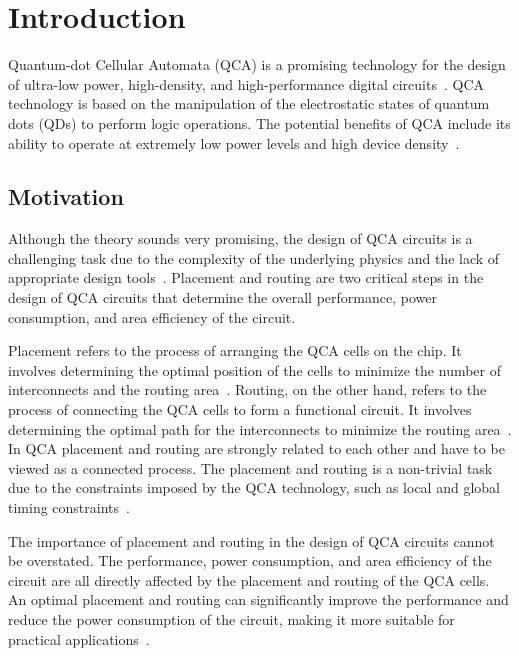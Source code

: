 
\chapter{Introduction}\label{chapter:introduction}
Quantum-dot Cellular Automata (QCA) is a promising technology for the design of ultra-low power, high-density, and high-performance digital circuits~\cite{perri2012new}. QCA technology is based on the manipulation of the electrostatic states of quantum dots (QDs) to perform logic operations. The potential benefits of QCA include its ability to operate at extremely low power levels and high device density~\cite{sen2015towards}.

\section{Motivation}
Although the theory sounds very promising, the design of QCA circuits is a challenging task due to the complexity of the underlying physics and the lack of appropriate design tools~\cite{safoev2020design}. Placement and routing are two critical steps in the design of QCA circuits that determine the overall performance, power consumption, and area efficiency of the circuit.

Placement refers to the process of arranging the QCA cells on the chip. It involves determining the optimal position of the cells to minimize the number of interconnects and the routing area~\cite{kahng2011vlsi}. Routing, on the other hand, refers to the process of connecting the QCA cells to form a functional circuit. It involves determining the optimal path for the interconnects to minimize the routing area~\cite{kahng2011vlsi}. In QCA placement and routing are strongly related to each other and have to be viewed as a connected process. The placement and routing is a non-trivial task due to the constraints imposed by the QCA technology, such as local and global timing constraints~\cite{ortho}.

The importance of placement and routing in the design of QCA circuits cannot be overstated. The performance, power consumption, and area efficiency of the circuit are all directly affected by the placement and routing of the QCA cells. An optimal placement and routing can significantly improve the performance and reduce the power consumption of the circuit, making it more suitable for practical applications~\cite{walter2018exact}.

